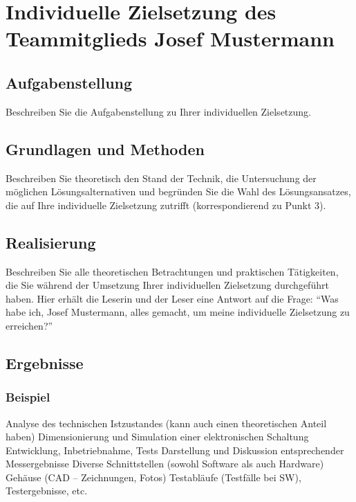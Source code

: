 \section{Individuelle Zielsetzung des Teammitglieds Josef
Mustermann}\label{sec:student1main}
\subsection{Aufgabenstellung}\label{sec:student1tasks}

Beschreiben Sie die Aufgabenstellung zu Ihrer individuellen Zielsetzung.
\subsection{Grundlagen und Methoden}\label{sec:student1methods}

Beschreiben Sie theoretisch den Stand der Technik, die Untersuchung der möglichen Lösungsalternativen und begründen Sie die Wahl des Lösungsansatzes, die auf Ihre individuelle Zielsetzung zutrifft (korrespondierend zu Punkt 3). 

\subsection{Realisierung}\label{sec:student1work}

Beschreiben Sie alle theoretischen Betrachtungen und praktischen Tätigkeiten, die Sie während der Umsetzung Ihrer individuellen Zielsetzung durchgeführt haben. 
Hier erhält die Leserin und der Leser eine Antwort auf die Frage: ``Was habe ich, Josef Mustermann, alles gemacht, um meine individuelle Zielsetzung zu erreichen?''

\subsection{Ergebnisse}\label{sec:student1results}

\subsubsection{Beispiel}
Analyse des technischen Istzustandes (kann auch einen theoretischen Anteil
haben) Dimensionierung und Simulation einer elektronischen Schaltung
Entwicklung, Inbetriebnahme, Tests
Darstellung und Diskussion entsprechender Messergebnisse
Diverse Schnittstellen (sowohl Software als auch Hardware)
Gehäuse (CAD – Zeichnungen, Fotos)
Testabläufe (Testfälle bei SW), Testergebnisse, etc.

